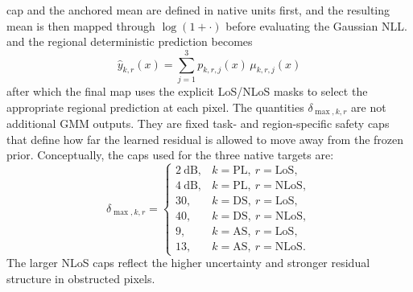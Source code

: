 \documentclass[11pt,a4paper]{article}
\begin{document}
cap and the anchored mean are defined in native units first, and the resulting
mean is then mapped through $\log(1+\cdot)$ before evaluating the Gaussian NLL.
and the regional deterministic prediction becomes
\begin{equation}
\hat y_{k,r}(x) = \sum_{j=1}^{3} p_{k,r,j}(x)\,\mu_{k,r,j}(x)
\label{eq:try80_region_point}
\end{equation}
after which the final map uses the explicit LoS/NLoS masks to select the
appropriate regional prediction at each pixel.
The quantities $\delta_{\max,k,r}$ are not additional GMM outputs. They are
fixed task- and region-specific safety caps that define how far the learned
residual is allowed to move away from the frozen prior. Conceptually, the caps
used for the three native targets are:
\begin{equation}
\delta_{\max,k,r}
=
\begin{cases}
2~\mathrm{dB}, & k=\mathrm{PL},\ r=\mathrm{LoS},\\
4~\mathrm{dB}, & k=\mathrm{PL},\ r=\mathrm{NLoS},\\
30, & k=\mathrm{DS},\ r=\mathrm{LoS},\\
40, & k=\mathrm{DS},\ r=\mathrm{NLoS},\\
9, & k=\mathrm{AS},\ r=\mathrm{LoS},\\
13, & k=\mathrm{AS},\ r=\mathrm{NLoS}.
\end{cases}
\label{eq:try80_native_residual_caps}
\end{equation}
The larger NLoS caps reflect the higher uncertainty and stronger residual
structure in obstructed pixels.
\end{document}
